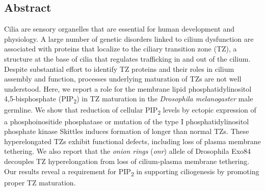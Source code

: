 \documentclass[12pt, twoside, letterpaper]{article}
\newcommand{\PIP}{PIP\textsubscript{2}}
\begin{document}
\vspace{-0.5cm}
\begin{doublespacing}
  \begin{linenumbers}
    \section*{Abstract}
    Cilia are sensory organelles that are essential for human development
    and physiology.
    A large number of genetic disorders linked to cilium dysfunction are
    associated with proteins that localize to the ciliary transition zone (TZ),
    a structure at the base of cilia that regulates trafficking in and out
    of the cilium.
    Despite substantial effort to identify TZ proteins and their roles
    in cilium assembly and function,
    processes underlying maturation of TZs are not well understood.
    Here, we report a role for the membrane lipid
    phosphatidylinositol 4,5-bisphosphate
    (\PIP{}) in TZ maturation
    in the \textit{Drosophila melanogaster} male germline.
    We show that reduction of cellular \PIP{} levels
    by ectopic expression of a phosphoinositide phosphatase
    or mutation of
    the type I phosphatidylinositol phosphate kinase Skittles
    induces formation of longer than normal TZs.
    These hyperelongated TZs exhibit functional defects,
    including loss of plasma membrane tethering.
    We also report that the \textit{onion rings} (\textit{onr}) allele
    of Drosophila Exo84
    decouples TZ hyperelongation from loss of cilium-plasma membrane tethering.
    Our results reveal a requirement for \PIP{} in supporting ciliogenesis
    by promoting proper TZ maturation.
    \newpage
    

\end{linenumbers}
\end{doublespacing}
\end{document}
